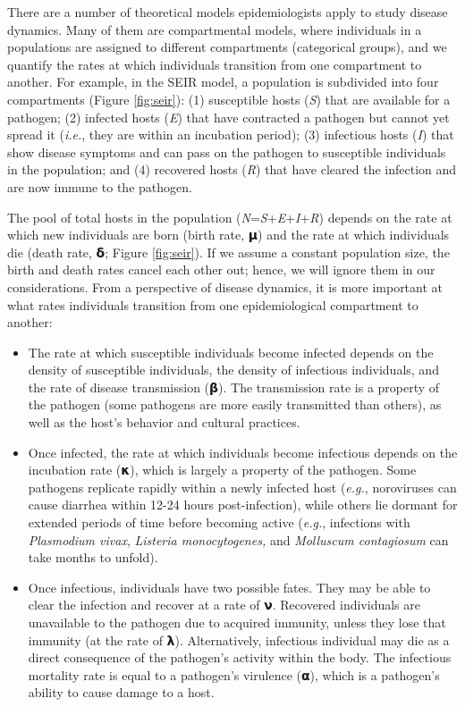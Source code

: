 \documentclass[
]{book}
\begin{document}
There are a number of theoretical models epidemiologists apply to study disease dynamics. Many of them are compartmental models, where individuals in a populations are assigned to different compartments (categorical groups), and we quantify the rates at which individuals transition from one compartment to another. For example, in the SEIR model, a population is subdivided into four compartments (Figure \ref{fig:seir}): (1) susceptible hosts (\emph{S}) that are available for a pathogen; (2) infected hosts (\emph{E}) that have contracted a pathogen but cannot yet spread it (\emph{i.e.}, they are within an incubation period); (3) infectious hosts (\emph{I}) that show disease symptoms and can pass on the pathogen to susceptible individuals in the population; and (4) recovered hosts (\emph{R}) that have cleared the infection and are now immune to the pathogen.

The pool of total hosts in the population (\emph{N}=\emph{S}+\emph{E}+\emph{I}+\emph{R}) depends on the rate at which new individuals are born (birth rate, 𝝻) and the rate at which individuals die (death rate, 𝝳; Figure \ref{fig:seir}). If we assume a constant population size, the birth and death rates cancel each other out; hence, we will ignore them in our considerations. From a perspective of disease dynamics, it is more important at what rates individuals transition from one epidemiological compartment to another:

\begin{itemize}
\item
  The rate at which susceptible individuals become infected depends on the density of susceptible individuals, the density of infectious individuals, and the rate of disease transmission (𝝱). The transmission rate is a property of the pathogen (some pathogens are more easily transmitted than others), as well as the host's behavior and cultural practices.
\item
  Once infected, the rate at which individuals become infectious depends on the incubation rate (𝝹), which is largely a property of the pathogen. Some pathogens replicate rapidly within a newly infected host (\emph{e.g.}, noroviruses can cause diarrhea within 12-24 hours post-infection), while others lie dormant for extended periods of time before becoming active (\emph{e.g.}, infections with \emph{Plasmodium vivax}, \emph{Listeria monocytogenes,} and \emph{Molluscum contagiosum} can take months to unfold).
\item
  Once infectious, individuals have two possible fates. They may be able to clear the infection and recover at a rate of 𝝼. Recovered individuals are unavailable to the pathogen due to acquired immunity, unless they lose that immunity (at the rate of 𝝺). Alternatively, infectious individual may die as a direct consequence of the pathogen's activity within the body. The infectious mortality rate is equal to a pathogen's virulence (𝝰), which is a pathogen's ability to cause damage to a host.
\end{itemize}
\end{document}
